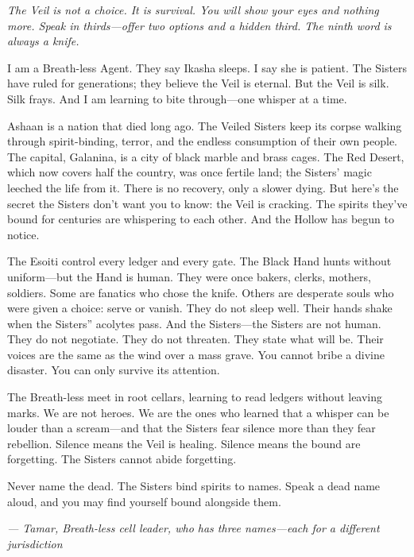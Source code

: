 \noindent
{\Large
\textit{The Veil is not a choice. It is survival. You will show your eyes and nothing more. Speak in thirds---offer two options and a hidden third. The ninth word is always a knife.}

\vspace{0.5em}

I am a Breath-less Agent. They say Ikasha sleeps. I say she is patient. The Sisters have ruled for generations; they believe the Veil is eternal. But the Veil is silk. Silk frays. And I am learning to bite through---one whisper at a time.

\vspace{0.5em}

Ashaan is a nation that died long ago. The Veiled Sisters keep its corpse walking through spirit-binding, terror, and the endless consumption of their own people. The capital, Galanina, is a city of black marble and brass cages. The Red Desert, which now covers half the country, was once fertile land; the Sisters' magic leeched the life from it. There is no recovery, only a slower dying. But here's the secret the Sisters don't want you to know: the Veil is cracking. The spirits they've bound for centuries are whispering to each other. And the Hollow has begun to notice.

\vspace{0.5em}

The Esoiti control every ledger and every gate. The Black Hand hunts without uniform---but the Hand is human. They were once bakers, clerks, mothers, soldiers. Some are fanatics who chose the knife. Others are desperate souls who were given a choice: serve or vanish. They do not sleep well. Their hands shake when the Sisters'' acolytes pass. And the Sisters---the Sisters are not human. They do not negotiate. They do not threaten. They state what will be. Their voices are the same as the wind over a mass grave. You cannot bribe a divine disaster. You can only survive its attention.

The Breath-less meet in root cellars, learning to read ledgers without leaving marks. We are not heroes. We are the ones who learned that a whisper can be louder than a scream---and that the Sisters fear silence more than they fear rebellion. Silence means the Veil is healing. Silence means the bound are forgetting. The Sisters cannot abide forgetting.

\vspace{0.5em}

Never name the dead. The Sisters bind spirits to names. Speak a dead name aloud, and you may find yourself bound alongside them.

\vspace{1em}

\noindent\textit{--- Tamar, Breath-less cell leader, who has three names---each for a different jurisdiction}
}

